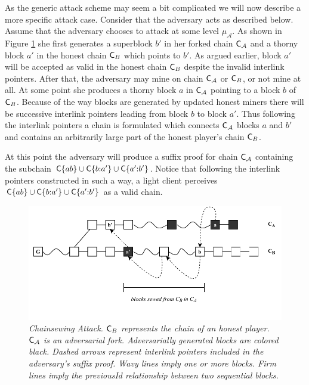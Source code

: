 As the generic attack scheme may seem a bit complicated we will now describe a more specific attack case. Consider that the adversary acts as described below. Assume that the adversary chooses to attack at some level $\mu_\mathcal{A}$. As shown in Figure \ref{fig:attack} she first generates a superblock $b'$ in her forked chain $\mathsf{C}_\mathcal{A}$ and a thorny block $a'$ in the honest chain $\mathsf{C}_B$ which points to $b'$. As argued earlier, block $a'$ will be accepted as valid in the honest chain $\mathsf{C}_B$ despite the invalid interlink pointers. After that, the adversary may mine on chain $\mathsf{C}_\mathcal{A}$ or $\mathsf{C}_B$, or not mine at all. At some point she produces a thorny block $a$ in $\mathsf{C}_\mathcal{A}$ pointing to a block $b$ of $\mathsf{C}_B$. Because of the way blocks are generated by updated honest miners there will be successive interlink pointers leading from block $b$ to block $a'$. Thus following the interlink pointers a chain is formulated which connects $\mathsf{C}_\mathcal{A}$ blocks $a$ and $b'$ and contains an arbitrarily
large part of the honest player's chain $\mathsf{C}_B$.

At this point the adversary will produce a suffix proof for chain $\mathsf{C}_\mathcal{A}$ containing the subchain $\mathsf{C}\{ab\} \cup \mathsf{C}\{b{:}a'\} \cup \mathsf{C}\{a'{:}b'\}$. Notice that following the interlink pointers constructed in such a way, a light client perceives $\mathsf{C}\{ab\} \cup \mathsf{C}\{b{:}a'\} \cup \mathsf{C}\{a'{:}b'\}$  as a valid chain.

\begin{figure}[h!]
	\begin{center}
		\includegraphics[scale=0.63]{figures/chainsewing_attack.pdf}
	\end{center}
	\caption{\textit{
		Chainsewing Attack. $\mathsf{C}_B$ represents the chain of an honest 	player. $\mathsf{C}_\mathcal{A}$ is an adversarial fork. Adversarially generated blocks are colored black. Dashed arrows represent	interlink pointers included in the adversary's suffix proof. Wavy lines imply one or more blocks. Firm lines imply the previousId 	relationship between two sequential blocks.}}
	\label{fig:attack}
\end{figure}

